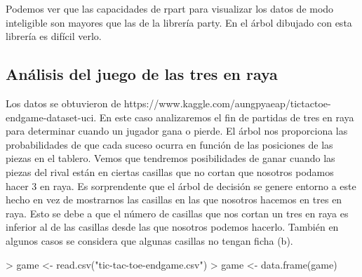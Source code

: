 \documentclass [a4paper] {article}
\begin{document}
Podemos ver que las capacidades de rpart para visualizar los datos de modo inteligible son mayores que las de la librería party.
En el árbol dibujado con esta librería es difícil verlo.

\subsection{Análisis del juego de las tres en raya}
Los datos se obtuvieron de https://www.kaggle.com/aungpyaeap/tictactoe-endgame-dataset-uci.
En este caso analizaremos el fin de partidas de tres en raya para determinar cuando un jugador gana o pierde.
El árbol nos proporciona las probabilidades de que cada suceso ocurra en función de las posiciones de las piezas en el tablero.
Vemos que tendremos posibilidades de ganar cuando las piezas del rival están en ciertas casillas que no cortan que nosotros podamos hacer 3 en raya.
Es sorprendente que el árbol de decisión se genere entorno a este hecho en vez de mostrarnos las casillas en las que nosotros hacemos en tres en raya.
Esto se debe a que el número de casillas que nos cortan un tres en raya es inferior al de las casillas desde las que nosotros podemos hacerlo.
También en algunos casos se considera que algunas casillas no tengan ficha (b).
\begin{Schunk}
\begin{Sinput}
> game <- read.csv("tic-tac-toe-endgame.csv")
> game <- data.frame(game)
\end{Sinput}
\end{Schunk}
\end{document}
